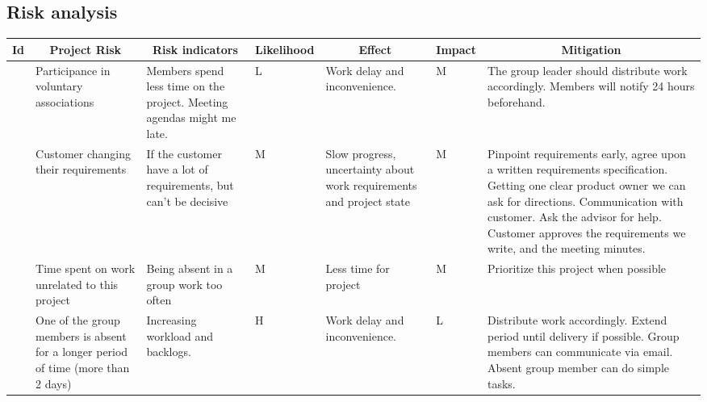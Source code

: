 \begin{landscape}
\subsection{Risk analysis}

\centering
\begin{longtable}{| p{0.4cm} | p{4cm} | p{4cm} | p{2cm} | p{4cm} | p{1cm} | p{4cm} |}
	\hline
		\multicolumn{1}{|c|}{ Id}   &
        \multicolumn{1}{c|}{ Project Risk}  &
		\multicolumn{1}{c|}{ Risk indicators}  &
		\multicolumn{1}{c|}{ Likelihood} &
		\multicolumn{1}{c|}{ Effect} &
		\multicolumn{1}{c|}{ Impact} &
		\multicolumn{1}{c|}{ Mitigation} \\
		\hline \hline
	\endhead

	\newcounter{riskId}

	\stepcounter{riskId}
	\centering
		\arabic{riskId} &
        Participance in voluntary associations &
		Members spend less time on the project. Meeting agendas might me late. &
		\centering L &
		Work delay and inconvenience. &
		\centering M &
		The group leader should distribute work accordingly. Members will notify 24 hours beforehand. \\
	\hline

	\stepcounter{riskId}
	\centering
		\arabic{riskId} &
        Customer changing their requirements &
		If the customer have a lot of requirements, but can’t be decisive &
		\centering M &
		Slow progress, uncertainty about work requirements and project state &
		\centering  M &
		Pinpoint requirements early, agree upon a written requirements
		specification. Getting one clear product owner we can ask for
		directions.  Communication with customer. Ask the advisor for help.
		Customer approves the requirements we write, and the meeting minutes.
		\\
	\hline

	\stepcounter{riskId}
	\centering
		\arabic{riskId} &
        Time spent on work unrelated to this project &
		Being absent in a group work too often &
		\centering M &
		Less time for project &
		\centering M &
		Prioritize this project when possible \\
	\hline

	\stepcounter{riskId}
	\centering
		\arabic{riskId} &
        One of the group members is absent for a longer period of time (more than 2 days) &
        Increasing workload and backlogs.
		& \centering H &
		Work delay and inconvenience. &
		\centering  L &
		Distribute work accordingly. Extend period until delivery if possible.
		Group members can communicate via email. Absent group member can do
		simple tasks. \\
	\hline


\end{longtable}
\end{landscape}
